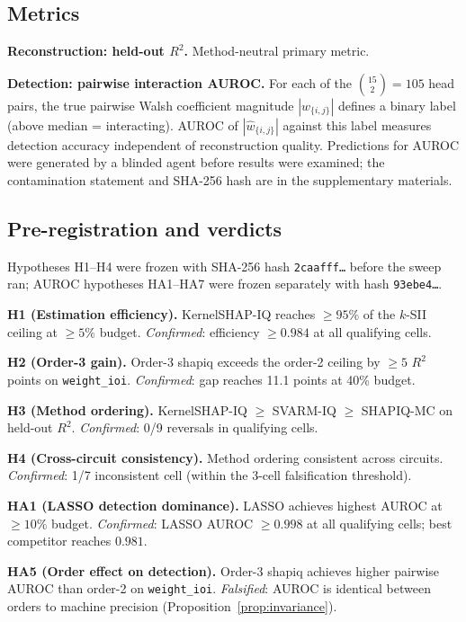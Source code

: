 \documentclass[11pt]{article}
\begin{document}
\subsection{Metrics}

\textbf{Reconstruction: held-out $R^2$.} Method-neutral primary
metric.

\textbf{Detection: pairwise interaction AUROC.} For each of the
$\binom{15}{2} = 105$ head pairs, the true pairwise Walsh coefficient
magnitude $|w_{\{i,j\}}|$ defines a binary label (above median =
interacting). AUROC of $|\hat{w}_{\{i,j\}}|$ against this label
measures detection accuracy independent of reconstruction quality.
Predictions for AUROC were generated by a blinded agent before
results were examined; the contamination statement and SHA-256 hash
are in the supplementary materials.

\subsection{Pre-registration and verdicts}

Hypotheses H1--H4 were frozen with SHA-256 hash
\texttt{2caafff\ldots} before the sweep ran; AUROC hypotheses
HA1--HA7 were frozen separately with hash \texttt{93ebe4\ldots}.

\textbf{H1 (Estimation efficiency).} KernelSHAP-IQ reaches
$\geq 95\%$ of the $k$-SII ceiling at $\geq 5\%$ budget.
\emph{Confirmed}: efficiency $\geq 0.984$ at all qualifying cells.

\textbf{H2 (Order-3 gain).} Order-3 shapiq exceeds the order-2
ceiling by $\geq 5$ $R^2$ points on \texttt{weight\_ioi}.
\emph{Confirmed}: gap reaches 11.1 points at 40\% budget.

\textbf{H3 (Method ordering).} KernelSHAP-IQ $\geq$ SVARM-IQ
$\geq$ SHAPIQ-MC on held-out $R^2$.
\emph{Confirmed}: 0/9 reversals in qualifying cells.

\textbf{H4 (Cross-circuit consistency).} Method ordering consistent
across circuits.
\emph{Confirmed}: 1/7 inconsistent cell (within the 3-cell
falsification threshold).

\textbf{HA1 (LASSO detection dominance).} LASSO achieves highest
AUROC at $\geq 10\%$ budget.
\emph{Confirmed}: LASSO AUROC $\geq 0.998$ at all qualifying cells;
best competitor reaches $0.981$.

\textbf{HA5 (Order effect on detection).} Order-3 shapiq achieves
higher pairwise AUROC than order-2 on \texttt{weight\_ioi}.
\emph{Falsified}: AUROC is identical between orders to machine
precision (Proposition~\ref{prop:invariance}).
\end{document}

